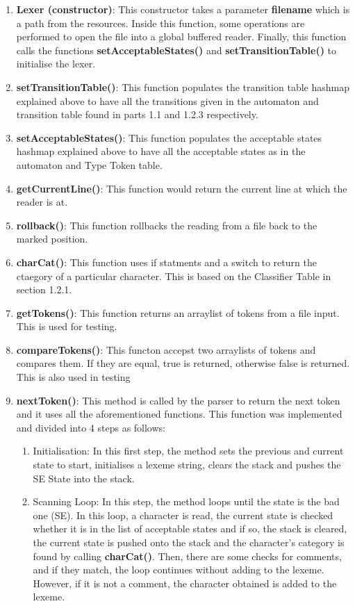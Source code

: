 \documentclass{article}
\begin{document}
					
					\begin{enumerate}
						\item \textbf{Lexer (constructor)}: This constructor takes a parameter \textbf{filename} which is a path from the resources. Inside this function, some operations are performed to open the file into a global buffered reader. Finally, this function calls the functions \textbf{setAcceptableStates()} and  \textbf{setTransitionTable()} to initialise the lexer.
						\item \textbf{setTransitionTable()}: This function populates the transition table hashmap explained above to have all the transitions given in the automaton and transition table found in parts 1.1 and 1.2.3 respectively.
						\item \textbf{setAcceptableStates()}: This function populates the acceptable states hashmap explained above to have all the acceptable states as in the automaton and Type Token table.
						\item \textbf{getCurrentLine()}: This function would return the current line at which the reader is at.
						\item \textbf{rollback()}: This function rollbacks the reading from a file back to the marked position.
						\item \textbf{charCat()}: This function uses if statments and a switch to return the ctaegory of a particular character. This is based on the Classifier Table in section 1.2.1.
						\item \textbf{getTokens()}: This function returns an arraylist of tokens from a file input. This is used for testing.
						\item \textbf{compareTokens()}: This functon accepst two arraylists of tokens and compares them. If they are equal, true is returned, otherwise false is returned. This is also used in testing
						\item \textbf{nextToken()}: This method is called by the parser to return the next token and it uses all the aforementioned functions. 
						This function was implemented and divided into 4 steps as follows:
						\begin{enumerate}
						\item Initialisation: In this first step, the method sets the previous and current state to start, initialises a lexeme string, clears the stack and pushes the SE State into the stack. 
						\item Scanning Loop: In this step, the method loops until the state is the bad one (SE). In this loop, a character is read, the current state is checked whether it is in the list of acceptable states and if so, the stack is cleared, the current state is pushed onto the stack and the character's category is found by calling \textbf{charCat()}. Then, there are some checks for comments, and if they match, the loop continues without adding to the lexeme. However, if it is not a comment, the character obtained is added to the lexeme.

\end{enumerate}
\end{enumerate}
\end{document}

